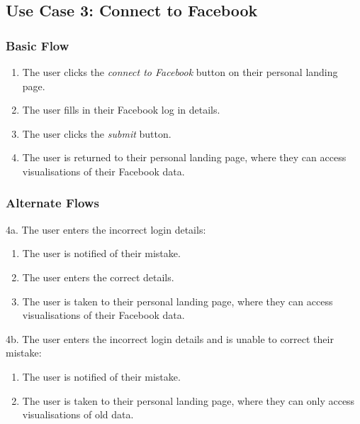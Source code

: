 \documentclass[12pt,onecolumn]{article}
\begin{document}
	\subsection{Use Case 3: Connect to Facebook}

		\subsubsection{Basic Flow}

		\begin{enumerate}
			\item The user clicks the \emph{connect to Facebook} button on their personal landing page.

			\item The user fills in their Facebook log in details.

			\item The user clicks the \emph{submit} button.

			\item The user is returned to their personal landing page, where they can access visualisations of their Facebook data.		

		\end{enumerate}

		\subsubsection{Alternate Flows}

		4a. The user enters the incorrect login details:

		\begin{enumerate}
			\item The user is notified of their mistake.

			\item The user enters the correct details.

			\item The user is taken to their personal landing page, where they can access visualisations of their Facebook data.
		\end{enumerate}

		4b. The user enters the incorrect login details and is unable to correct their mistake:

		\begin{enumerate}
			\item The user is notified of their mistake.

			\item The user is taken to their personal landing page, where they can only access visualisations of old data.
		\end{enumerate}
\end{document}
